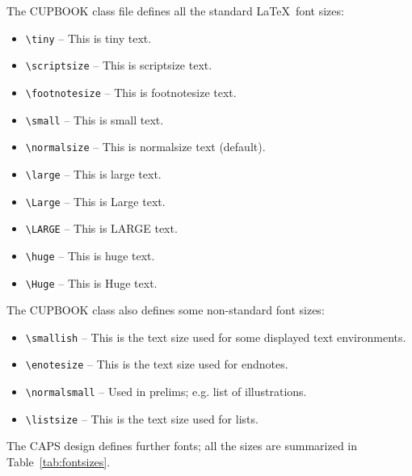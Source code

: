 \documentclass[cup6a]{cupbook}
\begin{document}
The CUPBOOK class file defines all the standard \LaTeX\ font sizes:
\begin{itemize}\listsize
  \item \verb"\tiny" -- {\tiny This is tiny text. }
  \item \verb"\scriptsize" -- {\scriptsize This is scriptsize text.}
  \item \verb"\footnotesize" -- {\footnotesize This is footnotesize text.}
  \item \verb"\small" -- {\small This is small text.}
  \item \verb"\normalsize" -- This is normalsize text (default).
  \item \verb"\large" -- {\large This is large text.}
  \item \verb"\Large" -- {\Large This is Large text.}
  \item \verb"\LARGE" -- {\LARGE This is LARGE text.}
  \item \verb"\huge" -- {\huge This is huge text.}
  \item \verb"\Huge" -- {\Huge This is Huge text.}
\end{itemize}
The CUPBOOK class also defines some non-standard font sizes:
\begin{itemize}\listsize
  \item \verb"\smallish" -- {\smallish This is the text size used for
        some displayed text environments.}
  \item \verb"\enotesize" -- {\enotesize This is the text size used for
        endnotes.}
  \item \verb"\normalsmall" -- {\normalsmall Used in prelims;
        e.g. list of illustrations.}
  \item \verb"\listsize" -- {\listsize This is the text size used for
        lists.}
\end{itemize}
The CAPS design defines further fonts;
all the sizes are summarized in Table~\ref{tab:fontsizes}.
\end{document}
